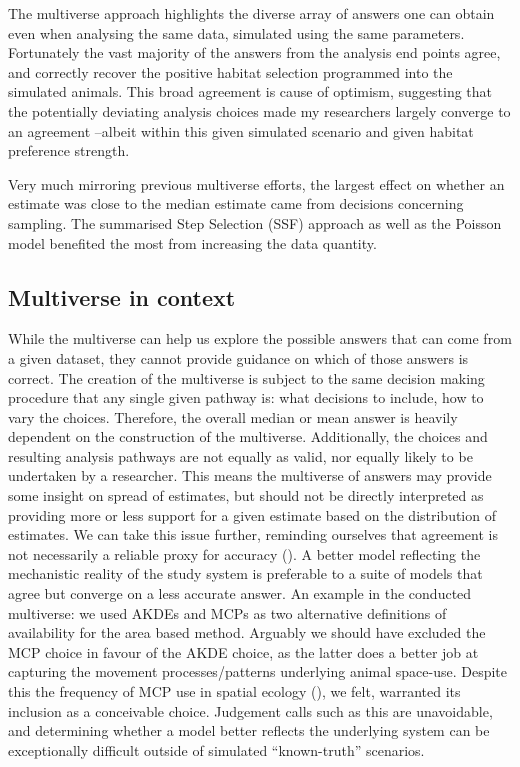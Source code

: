 \documentclass[10pt,a4paper]{article}
\begin{document}
The multiverse approach highlights the diverse array of answers one can obtain even when analysing the same data, simulated using the same parameters.
Fortunately the vast majority of the answers from the analysis end points agree, and correctly recover the positive habitat selection programmed into the simulated animals.
This broad agreement is cause of optimism, suggesting that the potentially deviating analysis choices made my researchers largely converge to an agreement --albeit within this given simulated scenario and given habitat preference strength.

Very much mirroring previous multiverse efforts, the largest effect on whether an estimate was close to the median estimate came from decisions concerning sampling.
The summarised Step Selection (SSF) approach as well as the Poisson model benefited the most from increasing the data quantity.

\subsection{Multiverse in context}\label{multiverse-in-context}

While the multiverse can help us explore the possible answers that can come from a given dataset, they cannot provide guidance on which of those answers is correct.
The creation of the multiverse is subject to the same decision making procedure that any single given pathway is: what decisions to include, how to vary the choices.
Therefore, the overall median or mean answer is heavily dependent on the construction of the multiverse.
Additionally, the choices and resulting analysis pathways are not equally as valid, nor equally likely to be undertaken by a researcher.
This means the multiverse of answers may provide some insight on spread of estimates, but should not be directly interpreted as providing more or less support for a given estimate based on the distribution of estimates.
We can take this issue further, reminding ourselves that agreement is not necessarily a reliable proxy for accuracy ().
A better model reflecting the mechanistic reality of the study system is preferable to a suite of models that agree but converge on a less accurate answer.
An example in the conducted multiverse: we used AKDEs and MCPs as two alternative definitions of availability for the area based method.
Arguably we should have excluded the MCP choice in favour of the AKDE choice, as the latter does a better job at capturing the movement processes/patterns underlying animal space-use.
Despite this the frequency of MCP use in spatial ecology (), we felt, warranted its inclusion as a conceivable choice.
Judgement calls such as this are unavoidable, and determining whether a model better reflects the underlying system can be exceptionally difficult outside of simulated ``known-truth'' scenarios.
\end{document}
